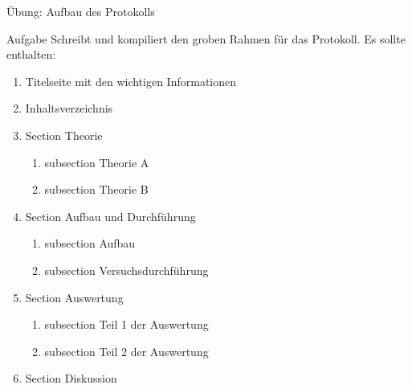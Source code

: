 \begin{frame}{Übung: Aufbau des Protokolls}
  \begin{block}{Aufgabe}
    Schreibt und kompiliert den groben Rahmen für das Protokoll.
    Es sollte enthalten:
    \begin{enumerate}
      \item Titelseite mit den wichtigen Informationen
      \item Inhaltsverzeichnis
      \item Section Theorie
        \begin{enumerate}
          \item subsection Theorie A
          \item subsection Theorie B
        \end{enumerate}
      \item Section Aufbau und Durchführung
        \begin{enumerate}
          \item subsection Aufbau
          \item subsection Versuchsdurchführung
        \end{enumerate}
      \item Section Auswertung
        \begin{enumerate}
          \item subsection Teil 1 der Auswertung
          \item subsection Teil 2 der Auswertung
        \end{enumerate}
      \item Section Diskussion
    \end{enumerate}
  \end{block}
\end{frame}

